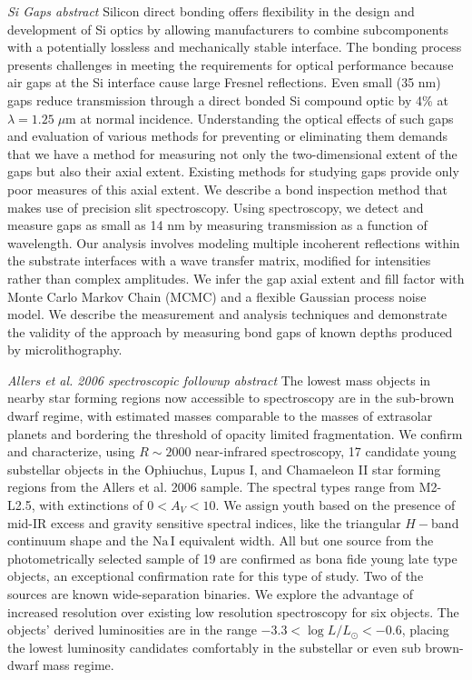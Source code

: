 \documentclass[12pt]{report}	%
\begin{document}
\emph{Si Gaps abstract}
Silicon direct bonding offers flexibility in the design and development of Si optics by allowing manufacturers to combine subcomponents with a potentially lossless and mechanically stable interface. The bonding process presents challenges in meeting the requirements for optical performance because air gaps at the Si interface cause large Fresnel reflections. Even small (35 nm) gaps reduce transmission through a direct bonded Si compound optic by 4\% at $\lambda = 1.25 \; \mu$m at normal incidence. Understanding the optical effects of such gaps and evaluation of various methods for preventing or eliminating them demands that we have a method for measuring not only the two-dimensional extent of the gaps but also their axial extent.  Existing methods for studying gaps provide only poor measures of this axial extent.  We describe a bond inspection method that makes use of precision slit spectroscopy.  Using spectroscopy, we detect and measure gaps as small as 14 nm by measuring transmission as a function of wavelength. Our analysis involves modeling multiple incoherent reflections within the substrate interfaces with a wave transfer matrix, modified for intensities rather than complex amplitudes. We infer the gap axial extent and fill factor with Monte Carlo Markov Chain (MCMC) and a flexible Gaussian process noise model.  We describe the measurement and analysis techniques and demonstrate the validity of the approach by measuring bond gaps of known depths produced by microlithography.

\emph{Allers et al. 2006 spectroscopic followup abstract}
The lowest mass objects in nearby star forming regions now accessible to spectroscopy are in the sub-brown dwarf regime, with estimated masses comparable to the masses of extrasolar planets and bordering the threshold of opacity limited fragmentation.  We confirm and characterize, using $R\sim 2000$ near-infrared spectroscopy, 17 candidate young substellar objects in the Ophiuchus, Lupus I, and Chamaeleon II star forming regions from the Allers et al. 2006 sample.  The spectral types range from M2-L2.5, with extinctions of $0 < A_V < 10$.  We assign youth based on the presence of mid-IR excess and gravity sensitive spectral indices, like the triangular $H-$band continuum shape and the $\mathrm{Na\, I}$ equivalent width.  All but one source from the photometrically selected sample of 19 are confirmed as bona fide young late type objects, an exceptional confirmation rate for this type of study.  Two of the sources are known wide-separation binaries.  We explore the advantage of increased resolution over existing low resolution spectroscopy for six objects.  The objects' derived luminosities are in the range $-3.3 < \log L/L_{\odot} < -0.6$, placing the lowest luminosity candidates comfortably in the substellar or even sub brown-dwarf mass regime.
\end{document}
